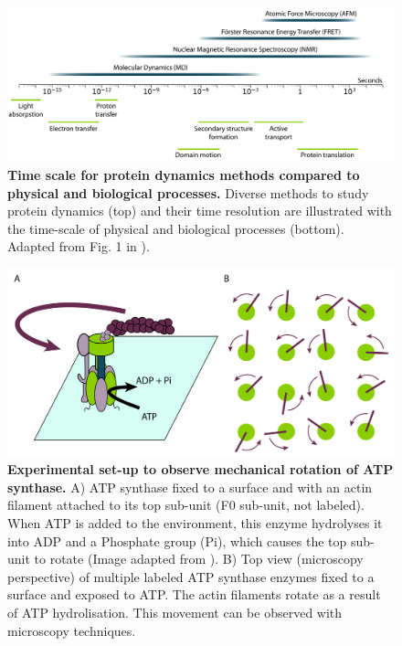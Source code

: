 \begin{figure}[tbh!]
    \centering
    \includegraphics[width=1\linewidth]{figures/timescale_dynamics.pdf}
    \caption{\textbf{Time scale for protein \gls{dynamics} methods compared to physical and biological processes.} Diverse methods to study protein \gls{dynamics} (top) and their time resolution are illustrated with the time-scale of physical and biological processes (bottom). Adapted from Fig. 1 in \cite{ode_molecular_2012}).}
    \label{fig:chapter1:timescale}
\end{figure}

\begin{figure}[tbh!]
    \centering
    \includegraphics[width=1\linewidth]{figures/experimental_techniques_microscopy.pdf}
    \caption{\textbf{Experimental set-up to observe mechanical rotation of ATP synthase.} A) ATP synthase fixed to a surface and with an actin filament attached to its top sub-unit (F0 sub-unit, not labeled). When ATP is added to the environment, this enzyme hydrolyses it into ADP and a Phosphate group (Pi), which causes the top sub-unit to rotate (Image adapted from \cite{sambongi_mechanical_1999}). B) Top view (\gls{microscopy} perspective) of multiple labeled ATP synthase enzymes fixed to a surface and exposed to ATP. The actin filaments rotate as a result of ATP hydrolisation. This movement can be observed with \gls{microscopy} techniques.}
    \label{fig:chapter1:synthase_rotation}
\end{figure}


